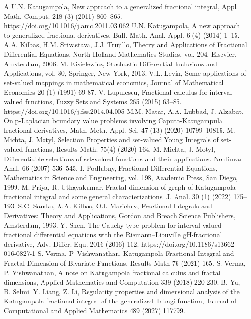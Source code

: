 \documentclass{amsproc}
\theoremstyle{definition}
\theoremstyle{remark}
\numberwithin{equation}{section}
\begin{document}
\begin{thebibliography}{A}
 U.N. Katugampola, New approach to a generalized fractional integral, Appl. Math. Comput. 218 (3) (2011) 860–865. https://doi.org/10.1016/j.amc.2011.03.062
 U.N. Katugampola, A new approach to generalized fractional derivatives, Bull. Math. Anal. Appl. 6 (4) (2014) 1–15.
 A.A. Kilbas, H.M. Srivastava, J.J. Trujillo, Theory and Applications of Fractional Differential Equations, North-Holland Mathematics Studies, vol. 204, Elsevier, Amsterdam, 2006.
 M. Kisielewicz, Stochastic Differential Inclusions and Applications, vol. 80, Springer,
New York, 2013.
 V.L. Levin, Some applications of set-valued mappings in mathematical economics, Journal of Mathematical Economics 20 (1) (1991) 69-87.
 V. Lupulescu, Fractional calculus for interval-valued functions, Fuzzy Sets and Systems 265 (2015) 63–85. https://doi.org/10.1016/j.fss.2014.04.005
 M.M. Matar, A.A. Lubbad, J. Alzabut, On p-Laplacian boundary value problems
involving Caputo-Katugampula fractional derivatives, Math. Meth. Appl. Sci. 47 (13) (2020) 10799–10816.
 M. Michta, J. Motyl, Selection Properties and set-valued Young Integrals of set-valued functions, Results
Math. 75(4) (2020) 164.
 M. Michta, J.  Motyl, Differentiable selections of set-valued functions and their
applications. Nonlinear Anal. 66 (2007) 536–545.
 I. Podlubny, Fractional Differential Equations, Mathematics in Science and Engineering, vol. 198, Academic Press, San Diego, 1999.
 M. Priya, R. Uthayakumar, Fractal dimension of graph of Katugampola fractional
integral and some general characterizations. J. Anal. 30 (1) (2022) 175–193.
  S.G. Samko, A.A. Kilbas, O.I. Marichev, Fractional Integrals and Derivatives: Theory and Applications, Gordon and Breach Science Publishers, Amsterdam, 1993.
 Y. Shen, The Cauchy type problem for interval-valued fractional differential equations with the Riemann–Liouville gH-fractional derivative, Adv. Differ. Equ. 2016 (2016) 102. https://doi.org/10.1186/s13662-016-0827-1
  S. Verma, P. Vishwanathan, Katugampola Fractional Integral and Fractal Dimension of Bivariate Functions, Results Math 76 (2021) 165.
 S. Verma, P. Vishwanathan, A note on Katugampola fractional calculus and fractal dimensions, Applied Mathematics and Computation 339 (2018) 220-230.
 B. Yu, B. Selmi, Y. Liang, Z. Li, Regularity properties and dimensional analysis of the Katugampola fractional integral of the generalized Takagi function, Journal of Computational and Applied Mathematics 489 (2027) 117799.

\end{thebibliography}
\end{document}
